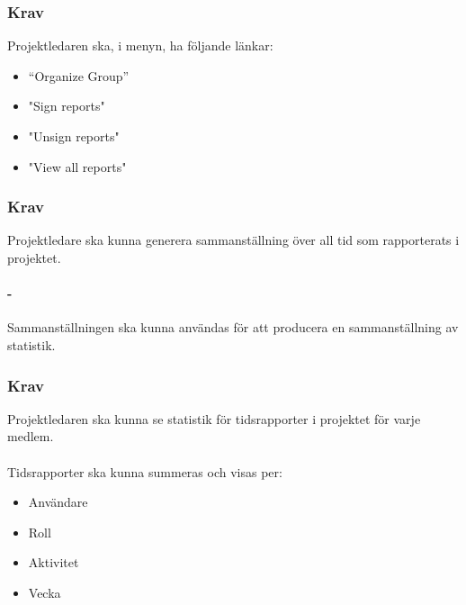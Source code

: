 \documentclass[paper=a4, fontsize=11pt,twoside]{article}
\begin{document}
\paragraph{}

\subsubsection{Krav}
 Projektledaren ska, i menyn, ha följande länkar:
 \begin{itemize}
 \item “Organize Group”
 \item "Sign reports"
 \item "Unsign reports"
 \item "View all reports"
 \end{itemize}

\paragraph{}

\subsubsection{Krav}
Projektledare ska kunna generera sammanställning över all tid som rapporterats i projektet.
\paragraph{-}
Sammanställningen ska kunna användas för att producera en sammanställning av statistik.

\paragraph{}

\subsubsection{Krav}
Projektledaren ska kunna se statistik för tidsrapporter i projektet för varje medlem.
\paragraph{}
Tidsrapporter ska kunna summeras och visas per:
\begin{itemize}
\item Användare
\item Roll
\item Aktivitet
\item Vecka
\end{itemize}
\end{document}
